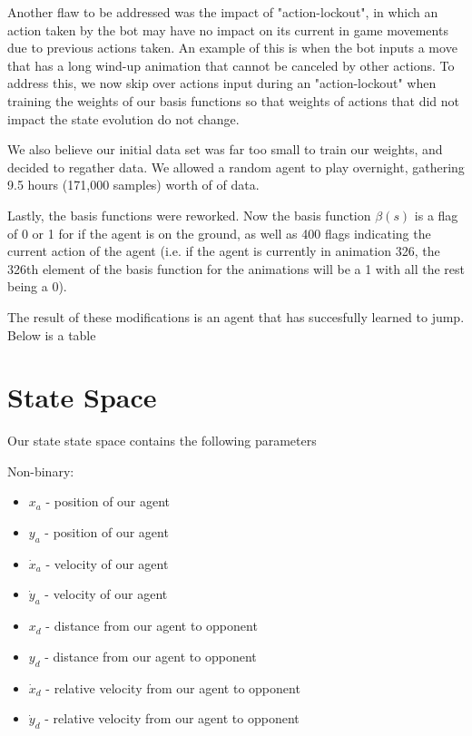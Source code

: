 \documentclass[11pt]{article}
\begin{document}
Another flaw to be addressed was the impact of "action-lockout", in which an action taken by the bot may have no impact on its current in game movements due to previous actions taken. An example of this is when the bot inputs a move that has a long wind-up animation that cannot be canceled by other actions. To address this, we now skip over actions input during an "action-lockout" when training the weights of our basis functions so that weights of actions that did not impact the state evolution do not change.

We also believe our initial data set was far too small to train our weights, and decided to regather data. We allowed a random agent to play overnight, gathering 9.5 hours (171,000 samples) worth of of data.

Lastly, the basis functions were reworked. Now the basis function $\beta(s)$ is a flag of 0 or 1 for if the agent is on the ground, as well as 400 flags indicating the current action of the agent (i.e. if the agent is currently in animation 326, the 326th element of the basis function for the animations will be a 1 with all the rest being a 0).

The result of these modifications is an agent that has succesfully learned to jump. Below is a table 
\vspace{2mm}

\section{State Space}
Our state state space contains the following parameters 

\vspace{2mm}

Non-binary:
\begin{itemize}
\item $x_{a}$ - position of our agent
\item $y_{a}$ - position of our agent
\item $\dot{x}_{a}$ - velocity of our agent
\item $\dot{y}_{a}$ - velocity of our agent
\item $x_{d}$ - distance from our agent to opponent 
\item $y_{d}$ - distance from our agent to opponent 
\item $\dot{x}_{d}$ - relative velocity from our agent to opponent
\item $\dot{y}_{d}$ - relative velocity from our agent to opponent
\end{itemize}
\end{document}
